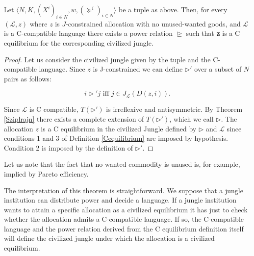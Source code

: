 \begin{theorem}
    Let $\langle N,K,(X^i)_{i\in N}, w, (\succeq^i)_{i\in N} \rangle$ be a tuple as above. Then, for every $(\mathcal{L},z)$ where $z$ is $J$-constrained allocation with no unused-wanted goods, and $\mathcal{L}$ is a C-compatible language there exists a power relation $\trianglerighteq$ such that \textbf{z} is a C equilibrium for the corresponding civilized jungle.
    \begin{proof}
        Let us consider the civilized jungle given by the tuple and the C-compatible language. Since $z$ is J-constrained we can define $\triangleright'$ over a subset of $N$ pairs as follows:

        \[i\triangleright' j \text{ iff } j\in J_{\mathcal{L}}(D(z,i)).\]

        Since $\mathcal{L}$ is C compatible, $T(\triangleright')$ is irreflexive and antisymmetric. By Theorem \ref{Sziplrajn} there exists a complete extension of $T(\triangleright')$, which we call $\triangleright$. The allocation $z$ is a C equilibrium in the civilized Jungle defined by $\triangleright$ and $\mathcal{L}$ since conditions 1 and 3 of Definition \ref{Cequilibrium} are imposed by hypothesis. Condition 2 is imposed by the definition of $\triangleright'$.
        
        

    \end{proof}
\end{theorem}

Let us note that the fact that no wanted commodity is unused is, for example, implied by Pareto efficiency.


\vspace{3mm}

The interpretation of this theorem is straightforward. We suppose that a jungle institution can distribute power and decide a language. If a jungle institution wants to attain a specific allocation as a civilized equilibrium it has just to check whether the allocation admits a C-compatible language. If so, the C-compatible language and the power relation derived from the C equilibrium definition itself will define the civilized jungle under which the allocation is a civilized equilibrium. 

